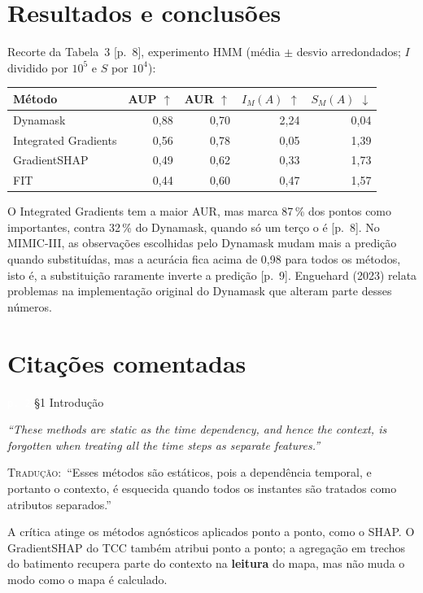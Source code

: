 \documentclass[11pt,a4paper]{article}
\newcommand{\pagechip}[1]{{\setlength{\fboxsep}{1.5pt}\colorbox{cAcc}{\textcolor{white}{\scriptsize\texttt{#1}}}}}
\newenvironment{origquote}{\par\itshape\small}{\par}
\newenvironment{tradquote}{\par\small\textsc{Tradução:}\ }{\par}
\newcommand{\explab}[1]{\par\smallskip{\small\color{cAcc}\textbf{\MakeUppercase{#1}}}\par}
\begin{document}
\section{Resultados e conclusões}
Recorte da Tabela~3 [p.~8], experimento HMM (média $\pm$ desvio arredondados; $I$ dividido por $10^5$ e $S$ por $10^4$):
\begin{center}\small
\begin{tabular}{lrrrr}
\toprule
\textbf{Método} & \textbf{AUP $\uparrow$} & \textbf{AUR $\uparrow$} & \textbf{$I_M(A)$ $\uparrow$} & \textbf{$S_M(A)$ $\downarrow$} \\
\midrule
Dynamask & 0,88 & 0,70 & 2,24 & 0,04 \\
Integrated Gradients & 0,56 & 0,78 & 0,05 & 1,39 \\
GradientSHAP & 0,49 & 0,62 & 0,33 & 1,73 \\
FIT & 0,44 & 0,60 & 0,47 & 1,57 \\
\bottomrule
\end{tabular}
\end{center}
O Integrated Gradients tem a maior AUR, mas marca 87\,\% dos pontos como importantes, contra 32\,\% do Dynamask, quando só um terço o é [p.~8]. No MIMIC-III, as observações escolhidas pelo Dynamask mudam mais a predição quando substituídas, mas a acurácia fica acima de 0,98 para todos os métodos, isto é, a substituição raramente inverte a predição [p.~9]. Enguehard (2023) relata problemas na implementação original do Dynamask que alteram parte desses números.

\section{Citações comentadas}

\begin{citacard}{\pagechip{p. 2} §1 Introdução}
\begin{origquote}“These methods are static as the time dependency, and hence the context, is forgotten when treating all the time steps as separate features.”\end{origquote}
\begin{tradquote}“Esses métodos são estáticos, pois a dependência temporal, e portanto o contexto, é esquecida quando todos os instantes são tratados como atributos separados.”\end{tradquote}
\explab{Explicação}
A crítica atinge os métodos agnósticos aplicados ponto a ponto, como o SHAP. O GradientSHAP do TCC também atribui ponto a ponto; a agregação em trechos do batimento recupera parte do contexto na \textbf{leitura} do mapa, mas não muda o modo como o mapa é calculado.
\end{citacard}
\end{document}
